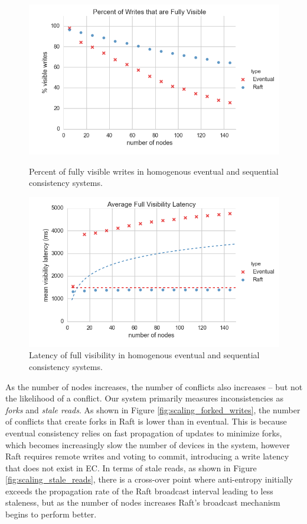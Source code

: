 \documentclass{article}
\begin{document}
\begin{figure}
    \centering
      \includegraphics[width=\linewidth]{figures/scaling/visible_writes}
      \caption{Percent of fully visible writes in homogenous eventual and sequential consistency systems.}
      \label{fig:scaling_visible_writes}
    \endminipage\hfill
      \includegraphics[width=\linewidth]{figures/scaling/visibility_latency}
      \caption{Latency of full visibility in homogenous eventual and sequential consistency systems.}
      \label{fig:scaling_visibility_latency}
    \endminipage
\end{figure}

As the number of nodes increases, the number of conflicts also increases -- but not the likelihood of a conflict. Our system primarily measures inconsistencies as \textit{forks} and \textit{stale reads}. As shown in Figure \ref{fig:scaling_forked_writes}, the number of conflicts that create forks in Raft is lower than in eventual. This is because eventual consistency relies on fast propagation of updates to minimize forks, which becomes increasingly slow the number of devices in the system, however Raft requires remote writes and voting to commit, introducing a write latency that does not exist in EC. In terms of stale reads, as shown in  Figure \ref{fig:scaling_stale_reads}, there is a cross-over point where anti-entropy initially exceeds the propagation rate of the Raft broadcast interval leading to less staleness, but as the number of nodes increases Raft's broadcast mechanism begins to perform better.
\end{document}
